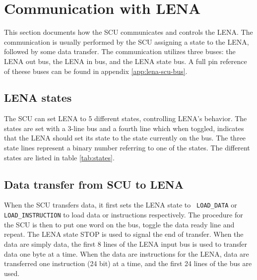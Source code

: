 \section{Communication with LENA}
\label{sec:SCU-LENA-communication}

This section documents how the \ac{SCU} communicates and controls the
\ac{LENA}. The communication is usually performed by the \ac{SCU} assigning a
state to the \ac{LENA}, followed by some data transfer. The communication utilizes three buses: 
the LENA out bus, the LENA in bus, and the LENA state bus. A full pin reference of theese buses can
be found in appendix \ref{app:lena-scu-bus}.

\subsection{LENA states}

The \ac{SCU} can set \ac{LENA} to 5 different states, controlling \ac{LENA}'s
behavior. The states are set with a 3-line bus and a fourth line which when
toggled, indicates that the \ac{LENA} should set its state to the state
currently on the bus. The three state lines represent a binary number referring
to one of the states. The different states are listed in table \ref{tab:states}.



\subsection{Data transfer from SCU to LENA}
When the \ac{SCU} transfers data, it first sets the \ac{LENA} state to {\tt
  LOAD\_DATA} or {\tt LOAD\_INSTRUCTION} to load data or instructions
respectively. The procedure for the \ac{SCU} is then to put one word on the bus,
toggle the data ready line and repeat. The \ac{LENA} state STOP is used to signal the
end of transfer. When the data are simply data, the first 8 lines of
the \ac{LENA} input bus is used to transfer data one byte at a time. When the
data are instructions for the \ac{LENA}, data are transferred one instruction (24
bit) at a time, and the first 24 lines of the bus are used.



